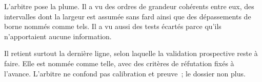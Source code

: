 \begin{boiteArbitre}
L'arbitre pose la plume. Il a vu des ordres de grandeur coh\'erents entre eux,
des intervalles dont la largeur est assum\'ee sans fard ainsi que des d\'epassements de borne
nomm\'es comme tels. Il a vu aussi des tests \'ecart\'es parce qu'ils
n'apportaient aucune information.

Il retient surtout la derni\`ere ligne, selon laquelle la validation prospective reste
\`a faire. Elle est nomm\'ee comme telle, avec des crit\`eres de r\'efutation
fix\'es \`a l'avance. L'arbitre ne confond pas calibration et preuve~; le dossier non
plus.
\end{boiteArbitre}
